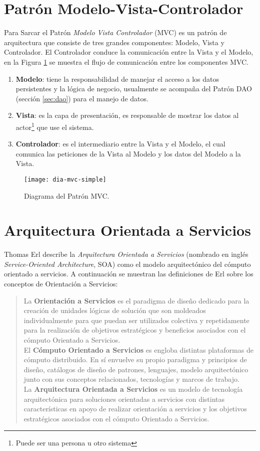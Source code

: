 \section{Patrón Modelo-Vista-Controlador}\label{sec:mvc}
Para Sarcar\cite{JavaDesignPatternsExamples} el Patrón \textit{Modelo Vista Controlador} (MVC) es un patrón de arquitectura que consiste de tres grandes componentes: Modelo, Vista y Controlador. El Controlador conduce la comunicación entre la Vista y el Modelo, en la Figura \ref{fig:dia-mvc-simple} se muestra el flujo de comunicación entre los componentes MVC.
\begin{enumerate}
	\item \textbf{Modelo}: tiene la responsabilidad de manejar el acceso a los datos persistentes y la lógica de negocio, usualmente se acompaña del Patrón DAO (sección \ref{sec:dao}) para el manejo de datos.
	\item \textbf{Vista}: es la capa de presentación, es responsable de mostrar los datos al actor\footnote{Puede ser una persona u otro sistema} que use el sistema.
	\item \textbf{Controlador}: es el intermediario entre la Vista y el Modelo, el cual comunica las peticiones de la Vista al Modelo y los datos del Modelo a la Vista.
\end{enumerate}
\begin{figure}[h]
  \centering
  \texttt{[image: dia-mvc-simple]}
  \caption{Diagrama del Patrón MVC\cite{JavaDesignPatternsExamples}.}
  \label{fig:dia-mvc-simple}
\end{figure}

\section{Arquitectura Orientada a Servicios}\label{sec:soa}
Thomas Erl describe la \textit{Arquitectura Orientada a Servicios} (nombrado en inglés \textit{Service-Oriented Architecture}, SOA) como el modelo arquitectónico del cómputo orientado a servicios\cite{SOAWithRest}. A continuación se muestran las definiciones de Erl\cite{SOAWithRest} sobre los conceptos de Orientación a Servicios:
\begin{quote}
La \textbf{Orientación a Servicios} es el paradigma de diseño dedicado para la creación de unidades lógicas de solución que son moldeados individualmente para que puedan ser utilizados colectiva y repetidamente para la realización de objetivos estratégicos y beneficios asociados con el cómputo Orientado a Servicios.\\
El \textbf{Cómputo Orientado a Servicios} es engloba distintas plataformas de cómputo distribuido. En sí envuelve su propio paradigma y principios de diseño, catálogos de diseño de patrones, lenguajes, modelo arquitectónico junto con sus conceptos relacionados, tecnologías y marcos de trabajo.\\
La \textbf{Arquitectura Orientada a Servicios} es un modelo de tecnología arquitectónica para soluciones orientadas a servicios con distintas características en apoyo de realizar orientación a servicios y los objetivos estratégicos asociados con el cómputo Orientado a Servicios.
\end{quote}
